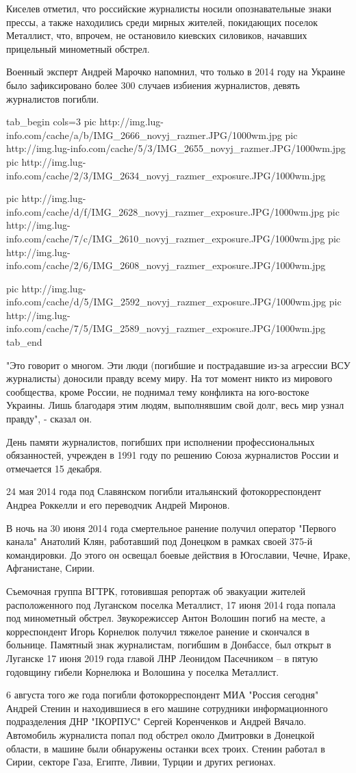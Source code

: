 Киселев отметил, что российские журналисты носили опознавательные знаки прессы,
а также находились среди мирных жителей, покидающих поселок Металлист, что,
впрочем, не остановило киевских силовиков, начавших прицельный минометный
обстрел.

Военный эксперт Андрей Марочко напомнил, что только в 2014 году на Украине было
зафиксировано более 300 случаев избиения журналистов, девять журналистов
погибли.

\ifcmt
tab_begin cols=3
	pic http://img.lug-info.com/cache/a/b/IMG_2666_novyj_razmer.JPG/1000wm.jpg
	pic http://img.lug-info.com/cache/5/3/IMG_2655_novyj_razmer.JPG/1000wm.jpg
	pic http://img.lug-info.com/cache/2/3/IMG_2634_novyj_razmer_exposure.JPG/1000wm.jpg

	pic http://img.lug-info.com/cache/d/f/IMG_2628_novyj_razmer_exposure.JPG/1000wm.jpg
	pic http://img.lug-info.com/cache/7/c/IMG_2610_novyj_razmer_exposure.JPG/1000wm.jpg
	pic http://img.lug-info.com/cache/2/6/IMG_2608_novyj_razmer_exposure.JPG/1000wm.jpg

	pic http://img.lug-info.com/cache/d/5/IMG_2592_novyj_razmer_exposure.JPG/1000wm.jpg
	pic http://img.lug-info.com/cache/7/5/IMG_2589_novyj_razmer_exposure.JPG/1000wm.jpg
tab_end
\fi

"Это говорит о многом. Эти люди (погибшие и пострадавшие из-за агрессии ВСУ
журналисты) доносили правду всему миру. На тот момент никто из мирового
сообщества, кроме России, не поднимал тему конфликта на юго-востоке Украины.
Лишь благодаря этим людям, выполнявшим свой долг, весь мир узнал правду", -
сказал он.

День памяти журналистов, погибших при исполнении профессиональных обязанностей,
учрежден в 1991 году по решению Союза журналистов России и отмечается 15
декабря.

24 мая 2014 года под Славянском погибли итальянский фотокорреспондент Андреа
Роккелли и его переводчик Андрей Миронов.

В ночь на 30 июня 2014 года смертельное ранение получил оператор "Первого
канала" Анатолий Клян, работавший под Донецком в рамках своей 375-й
командировки. До этого он освещал боевые действия в Югославии, Чечне, Ираке,
Афганистане, Сирии.

Съемочная группа ВГТРК, готовившая репортаж об эвакуации жителей расположенного
под Луганском поселка Металлист, 17 июня 2014 года попала под минометный
обстрел. Звукорежиссер Антон Волошин погиб на месте, а корреспондент Игорь
Корнелюк получил тяжелое ранение и скончался в больнице. Памятный знак
журналистам, погибшим в Донбассе, был открыт в Луганске 17 июня 2019 года
главой ЛНР Леонидом Пасечником – в пятую годовщину гибели Корнелюка и Волошина
у поселка Металлист.

6 августа того же года погибли фотокорреспондент МИА "Россия сегодня" Андрей
Стенин и находившиеся в его машине сотрудники информационного подразделения ДНР
"IКОРПУС" Сергей Коренченков и Андрей Вячало. Автомобиль журналиста попал под
обстрел около Дмитровки в Донецкой области, в машине были обнаружены останки
всех троих. Стенин работал в Сирии, секторе Газа, Египте, Ливии, Турции и
других регионах. 

